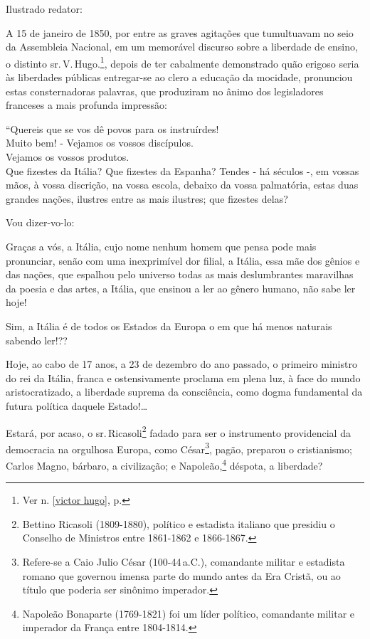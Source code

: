 Ilustrado redator:

A 15 de janeiro de 1850, por entre as graves agitações que tumultuavam
no seio da Assembleia Nacional, em um memorável discurso sobre a
liberdade de ensino, o distinto sr.\,V.\,Hugo.\footnote{Ver n. \ref{victor hugo}, 
p. \pageref{victor hugo}}, depois de ter cabalmente demonstrado quão 
erigoso seria às liberdades públicas entregar-se ao clero a educação 
da mocidade, pronunciou estas consternadoras palavras, que produziram 
no ânimo dos legisladores franceses a mais profunda impressão:

``Quereis que se vos dê povos para os instruírdes!\\
Muito bem! - Vejamos os vossos discípulos.\\
Vejamos os vossos produtos.\\
Que fizestes da Itália? Que fizestes da Espanha? Tendes - há séculos -,
em vossas mãos, à vossa discrição, na vossa escola, debaixo da vossa
palmatória, estas duas grandes nações, ilustres entre as mais ilustres;
que fizestes delas?

Vou dizer-vo-lo:

Graças a vós, a Itália, cujo nome nenhum homem que pensa pode mais
pronunciar, senão com uma inexprimível dor filial, a Itália, essa mãe
dos gênios e das nações, que espalhou pelo universo todas as mais
deslumbrantes maravilhas da poesia e das artes, a Itália, que ensinou a
ler ao gênero humano, não sabe ler hoje!

Sim, a Itália é de todos os Estados da Europa o em que há menos naturais
sabendo ler!??

Hoje, ao cabo de 17 anos, a 23 de dezembro do ano passado, o primeiro
ministro do rei da Itália, franca e ostensivamente proclama em plena
luz, à face do mundo aristocratizado, a liberdade suprema da
consciência, como dogma fundamental da futura política daquele
Estado!\ldots{}

Estará, por acaso, o sr.\,Ricasoli\footnote{Bettino Ricasoli
  (1809-1880), político e estadista italiano que presidiu o Conselho de
  Ministros entre 1861-1862 e 1866-1867.} fadado para ser o instrumento
providencial da democracia na orgulhosa Europa, como César\footnote{
  Refere-se a Caio Julio César (100-44\,a.C.), comandante militar e
  estadista romano que governou imensa parte do mundo antes da Era
  Cristã, ou ao título que poderia ser sinônimo imperador.}, pagão,
preparou o cristianismo; Carlos Magno, bárbaro, a civilização; e
Napoleão,\footnote{Napoleão Bonaparte (1769-1821) foi um líder
  político, comandante militar e imperador da França entre 1804-1814.\label{napoleao}}
déspota, a liberdade?

